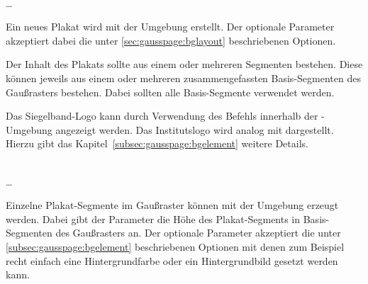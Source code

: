 \begin{Declaration}
    \\
  \quad\dots\\
\end{Declaration}

Ein neues Plakat wird mit der Umgebung  erstellt.
Der optionale Parameter  akzeptiert dabei die
unter \ref{sec:gausspage:bglayout} beschriebenen Optionen.

Der Inhalt des Plakats sollte aus einem oder mehreren Segmenten bestehen.
Diese können jeweils aus einem oder mehreren zusammengefassten Basis-Segmenten
des Gaußrasters bestehen. Dabei sollten alle Basis-Segmente verwendet werden.

\begin{sloppypar}
Das Siegelband-Logo kann durch Verwendung des Befehls 
innerhalb der -Umgebung angezeigt werden.
Das Institutslogo wird analog mit 
dargestellt. Hierzu gibt das Kapitel~\ref{subsec:gausspage:bgelement}
weitere Details.
\end{sloppypar}

\begin{Declaration}
    \\
  \quad\dots\\
\end{Declaration}

Einzelne Plakat-Segmente im Gaußraster können mit der Umgebung
 erzeugt werden.
Dabei gibt der Parameter  die Höhe des
Plakat-Segments in Basis-Segmenten des Gaußrasters an.
Der optionale Parameter  akzeptiert die
unter \ref{subsec:gausspage:bgelement} beschriebenen Optionen mit
denen zum Beispiel recht einfach eine Hintergrundfarbe oder ein Hintergrundbild
gesetzt werden kann.

